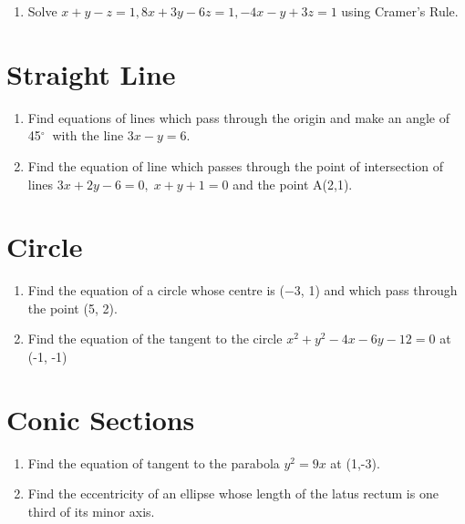 \documentclass[17pt]{extarticle}
\newcommand{\degree}{$^{\circ}\ $} %
\begin{document}
\begin{multicols}{2}
\begin{enumerate}
\item Solve $x +y - z = 1,  8x +3y - 6z = 1, -4x - y + 3z = 1$ using Cramer's Rule.
\end{enumerate} 

\section{Straight Line}
\noindent
\begin{enumerate}
\item Find equations of lines which pass
through the origin and make an angle of 45\degree
with the line $3x - y = 6.$

\item Find the equation of line which passes
	 through the point of intersection of lines
	 $3 x + 2 y - 6 = 0 ,\; x + y + 1 = 0$ and the point A(2,1).

\end{enumerate} 

\section{Circle}
\noindent
\begin{enumerate}

\item Find the equation of a circle whose centre is
(−3, 1) and which pass through the point (5, 2).

\item Find the equation of the tangent to the circle $x^2 + y^2 - 4x - 6y - 12 = 0$ at (-1, -1)

\end{enumerate} 

\section{Conic Sections}
\noindent
\begin{enumerate}
\item Find the equation of tangent to the parabola
$y^2 = 9x$ at (1,-3).

\item Find the eccentricity of an ellipse whose
length of the latus rectum is one third of its
minor axis.

\end{enumerate} 


\end{multicols}
\end{document}
